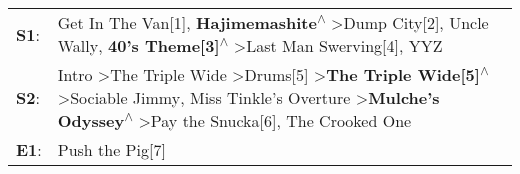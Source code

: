\begin{supertabular}{p{0.03\textwidth}p{0.92\textwidth}}
 \textbf{S1}:  &                                                                                                                                                     Get In The Van[1]\textsuperscript{}, \enspace \textbf{Hajimemashite\textsuperscript{$\wedge$}} \textgreater \enspace Dump City[2]\textsuperscript{}, \enspace Uncle Wally\textsuperscript{}, \enspace \textbf{40's Theme[3]\textsuperscript{$\wedge$}} \textgreater \enspace Last Man Swerving[4]\textsuperscript{}, \enspace YYZ\textsuperscript{}  \enspace  \\
 \textbf{S2}:  &  Intro\textsuperscript{} \textgreater \enspace The Triple Wide\textsuperscript{} \textgreater \enspace Drums[5]\textsuperscript{} \textgreater \enspace \textbf{The Triple Wide[5]\textsuperscript{$\wedge$}} \textgreater \enspace Sociable Jimmy\textsuperscript{}, \enspace Miss Tinkle's Overture\textsuperscript{} \textgreater \enspace \textbf{Mulche's Odyssey\textsuperscript{$\wedge$}} \textgreater \enspace Pay the Snucka[6]\textsuperscript{}, \enspace The Crooked One\textsuperscript{}  \enspace  \\
 \textbf{E1}:  &                                                                                                                                                                                                                                                                                                                                                                                                                                                                       Push the Pig[7]\textsuperscript{}  \enspace  \\
\end{supertabular}
